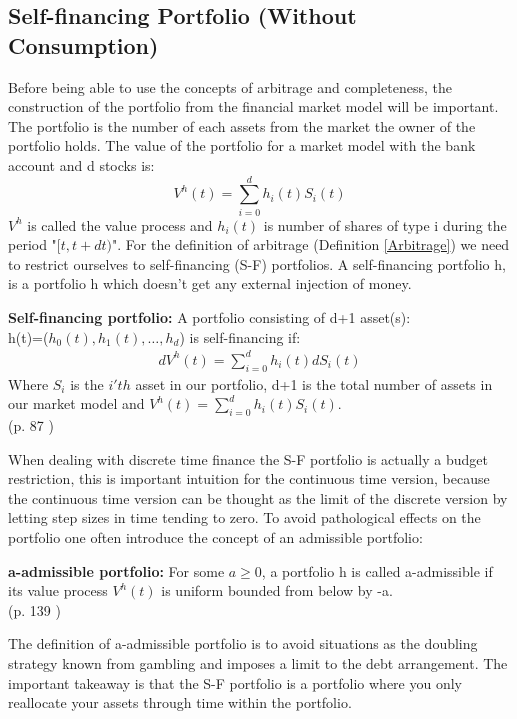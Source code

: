 \subsection{Self-financing Portfolio (Without Consumption)}
Before being able to use the concepts of arbitrage and completeness, the construction of the portfolio from the financial market model will be important. The portfolio is the number of each assets from the market the owner of the portfolio holds. The value of the portfolio for a market model with the bank account and d stocks is:
\begin{equation*}
V^h(t)=\sum_{i=0}^{d} h_{i}(t) S_i(t)
\end{equation*}
$V^h$ is called the value process and $h_i(t)$ is number of shares of type i during the period "$[t,t+dt)$". For the definition of arbitrage (Definition \ref{Arbitrage}) we need to restrict ourselves to self-financing (S-F) portfolios. A self-financing portfolio h, is a portfolio h which doesn't get any external injection of money.
\theoremstyle{definition}
\begin{definition}{\textbf{Self-financing portfolio: }}
A portfolio consisting of d+1 asset(s): \\
h(t)=($h_0(t),h_1(t), \dotsc, h_{d}$) is self-financing if:
\begin{equation*}\label{SF}
\begin{split}
dV^{h}(t)=\sum_{i=0}^{d} h_{i}(t) dS_{i}(t)
\end{split}
\end{equation*}
Where $S_{i}$ is the $i'th$ asset in our portfolio, d+1 is the total number of assets in our market model and $V^{h}(t)=\sum_{i=0}^{d} h_{i}(t) S_{i}(t)$.\\ \null \hfill (p. 87 \parencite{finKont})
\end{definition}
When dealing with discrete time finance the S-F portfolio is actually a budget restriction, this is important intuition for the continuous time version, because the continuous time version can be thought as the limit of the discrete version by letting step sizes in time tending to zero. To avoid pathological effects on the portfolio one often introduce the concept of an admissible portfolio:
\theoremstyle{definition}
\begin{definition}{\textbf{a-admissible portfolio: }}
For some $a\geq 0$, a portfolio h is called a-admissible if its value process $V^h(t)$ is uniform bounded from below by -a.\\
\null \hfill (p. 139 \parencite{finKont})
\end{definition}
The definition of a-admissible portfolio is to avoid situations as the doubling strategy known from gambling and imposes a limit to the debt arrangement. The important takeaway is that the S-F portfolio is a portfolio where you only reallocate your assets through time within the portfolio.

